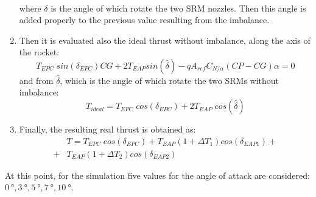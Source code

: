 \documentclass[12pt,fleqn,openany]{book} %
\begin{document}
\begin{enumerate}
\begin{equation}
\begin{split}
 \end{split}
 \end{equation}
 where $\delta$ is the angle of which rotate the two SRM nozzles. Then this angle is added properly to the previous value resulting from the imbalance.\\
 \item Then it is evaluated also the ideal thrust without imbalance, along the axis of the rocket: 
 \begin{equation}
  T_{EPC}\;sin(\delta_{EPC})CG+2T_{EAP}sin(\hat{\delta})-qA_{ref}C_{N/\alpha}(CP-CG)\alpha=0
 \end{equation}
 and from $\hat{\delta}$, which is the angle of which rotate the two SRMs without imbalance: 
 \begin{equation}
  T_{ideal}=T_{EPC}\;cos(\delta_{EPC})+2T_{EAP}\;cos(\hat{\delta})
 \end{equation}
 \item Finally, the resulting real thrust is obtained as:
 \begin{equation}\begin{split}
  &T=T_{EPC}\;cos(\delta_{EPC})+T_{EAP}(1+\Delta T_1)cos(\delta_{EAP1})+\\
  +&T_{EAP}(1+\Delta T_2)cos(\delta_{EAP2})
 \end{split}\end{equation}
 \end{enumerate} 
 At this point, for the simulation five values for the angle of attack are considered:\\ $\SI{0}{\degree}, \SI{3}{\degree}, \SI{5}{\degree}, \SI{7}{\degree}, \SI{10}{\degree}$. 
\end{document}
